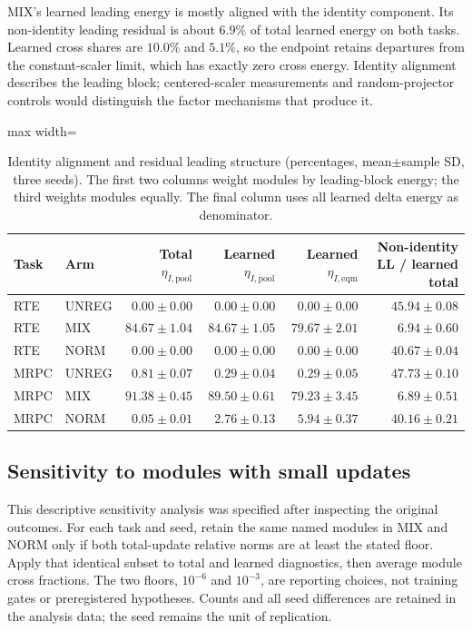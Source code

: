 \documentclass{article}
\begin{document}
MIX's learned leading energy is mostly aligned with the identity component. Its non-identity leading residual is about $6.9\%$ of total learned energy on both tasks. Learned cross shares are $10.0\%$ and $5.1\%$, so the endpoint retains departures from the constant-scaler limit, which has exactly zero cross energy. Identity alignment describes the leading block; centered-scaler measurements and random-projector controls would distinguish the factor mechanisms that produce it.

\begin{table}[t]
\centering
\caption{Identity alignment and residual leading structure (percentages, mean$\pm$sample SD, three seeds). The first two columns weight modules by leading-block energy; the third weights modules equally. The final column uses all learned delta energy as denominator.}
\label{tab:reviewidentity}
\begin{adjustbox}{max width=\linewidth}
\begin{tabular}{llrrrr}
\toprule
Task & Arm & Total $\eta_{I,\mathrm{pool}}$ & Learned $\eta_{I,\mathrm{pool}}$ & Learned $\eta_{I,\mathrm{eqm}}$ & Non-identity LL / learned total\\
\midrule
RTE & UNREG & $0.00 \pm 0.00$ & $0.00 \pm 0.00$ & $0.00 \pm 0.00$ & $45.94 \pm 0.08$ \\
RTE & MIX & $84.67 \pm 1.04$ & $84.67 \pm 1.05$ & $79.67 \pm 2.01$ & $6.94 \pm 0.60$ \\
RTE & NORM & $0.00 \pm 0.00$ & $0.00 \pm 0.00$ & $0.00 \pm 0.00$ & $40.67 \pm 0.04$ \\
MRPC & UNREG & $0.81 \pm 0.07$ & $0.29 \pm 0.04$ & $0.29 \pm 0.05$ & $47.73 \pm 0.10$ \\
MRPC & MIX & $91.38 \pm 0.45$ & $89.50 \pm 0.61$ & $79.23 \pm 3.45$ & $6.89 \pm 0.51$ \\
MRPC & NORM & $0.05 \pm 0.01$ & $2.76 \pm 0.13$ & $5.94 \pm 0.37$ & $40.16 \pm 0.21$ \\
\bottomrule
\end{tabular}
\end{adjustbox}
\end{table}

\subsection{Sensitivity to modules with small updates}
\label{app:reviewsensitivity}
This descriptive sensitivity analysis was specified after inspecting the original outcomes. For each task and seed, retain the same named modules in MIX and NORM only if both total-update relative norms are at least the stated floor. Apply that identical subset to total and learned diagnostics, then average module cross fractions. The two floors, $10^{-6}$ and $10^{-3}$, are reporting choices, not training gates or preregistered hypotheses. Counts and all seed differences are retained in the analysis data; the seed remains the unit of replication.
\end{document}
